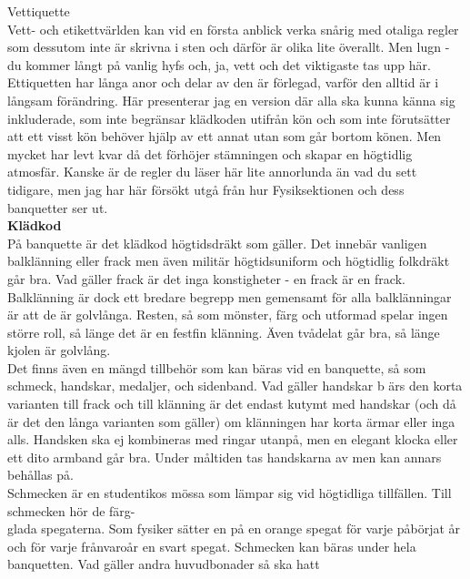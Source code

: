 \documentclass[a6paper,12pt]{article}
\begin{document}
\newpage
\setlength{\oddsidemargin}{-0.57in}
\noindent %
\Large Vettiquette\\
\footnotesize Vett- och etikettvärlden kan vid en första anblick verka 
snårig med otaliga regler som dessutom inte är skrivna i sten och 
därför är olika lite överallt. Men lugn - du kommer långt på vanlig 
hyfs och, ja, vett och det viktigaste tas upp här. Ettiquetten har 
långa anor och delar av den är förlegad, varför den alltid är i 
långsam förändring. Här presenterar jag en version där alla ska kunna 
känna sig inkluderade, som inte begränsar klädkoden utifrån kön och 
som inte förutsätter att ett visst kön behöver hjälp av ett annat 
utan som går bortom könen. Men mycket har levt kvar då det förhöjer 
stämningen och skapar en högtidlig atmosfär. Kanske är de regler du läser 
här lite annorlunda än vad du sett tidigare, men jag har här försökt 
utgå från hur Fysiksektionen och dess banquetter ser ut.\\
\normalsize\textbf{Klädkod}\\
\footnotesize På banquette är det klädkod högtidsdräkt som gäller. 
Det innebär vanligen balklänning eller frack men även militär högtidsuniform 
och högtidlig folkdräkt går bra. Vad gäller frack är det inga konstigheter 
- en frack är en frack. Balklänning är dock ett bredare begrepp men 
gemensamt för alla balklänningar är att de är golvlånga. Resten, så 
som mönster, färg och utformad spelar ingen större roll, så länge det 
är en festfin klänning. Även tvådelat går bra, så länge kjolen är golvlång.\\
Det finns även en mängd tillbehör som kan bäras vid en banquette, 
så som schmeck, handskar, medaljer, och sidenband. Vad gäller handskar b
ärs den korta 
\newpage
\setlength{\oddsidemargin}{-0.37in}
\noindent
varianten till frack och till klänning är det endast kutymt med handskar 
(och då är det den långa varianten som gäller) om klänningen har korta 
ärmar eller inga alls. Handsken ska ej kombineras med ringar utanpå, 
men en elegant klocka eller ett dito armband går bra. Under måltiden 
tas handskarna av men kan annars behållas på.\\
Schmecken är en studentikos mössa som lämpar sig vid högtidliga 
tillfällen. Till schmecken hör de färg-\\
glada spegaterna. Som fysiker sätter en på en orange spegat för 
varje påbörjat år och för varje frånvaroår en svart spegat. Schmecken kan 
bäras under hela banquetten. Vad gäller andra huvudbonader så ska hatt 
\end{document}
